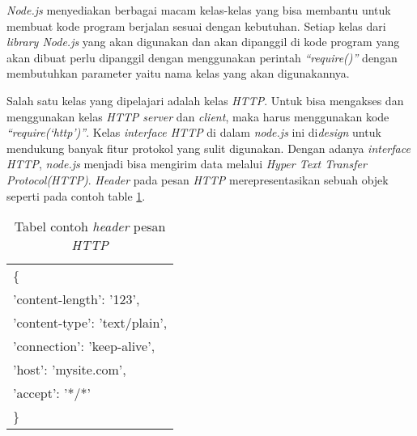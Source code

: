 \documentclass[a4paper,twoside]{article}
\begin{document}
\begin{enumerate}
\textit{Node.js} menyediakan berbagai macam kelas-kelas yang bisa membantu untuk membuat kode program berjalan sesuai dengan kebutuhan. Setiap kelas dari \textit{library Node.js} yang akan digunakan dan akan dipanggil di kode program yang akan dibuat perlu dipanggil dengan menggunakan perintah \textit{``require()''} dengan membutuhkan parameter yaitu nama kelas yang akan digunakannya.

Salah satu kelas yang dipelajari adalah kelas \textit{HTTP}. Untuk bisa mengakses dan menggunakan kelas \textit{HTTP server} dan \textit{client}, maka harus menggunakan kode \textit{``require(`http')''}. Kelas \textit{interface HTTP} di dalam \textit{node.js} ini di\textit{design} untuk mendukung banyak fitur protokol yang sulit digunakan. Dengan adanya \textit{interface HTTP}, \textit{node.js} menjadi bisa mengirim data melalui \textit{Hyper Text Transfer Protocol(HTTP)}. \textit{Header} pada pesan \textit{HTTP} merepresentasikan sebuah objek seperti pada contoh table \ref{tab:contoh_header_pesan_http}. 

\begin{table}[H]
	\centering 
	\caption{Tabel contoh \textit{header} pesan \textit{HTTP}}
	\label{tab:contoh_header_pesan_http}
	\begin{tabular}{|p{6cm}|}
	\hline
	\{\\
	'content-length': '123',\\
  	'content-type': 'text/plain',\\
  	'connection': 'keep-alive',\\
  	'host': 'mysite.com',\\
  	'accept': '*/*' \\
  	\}\\
	\hline
\end{tabular}  
\end{table}


\end{enumerate}
\end{document}
